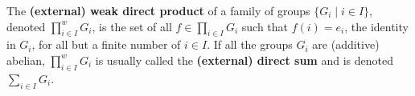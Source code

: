 \begin{definition}
The \textbf{(external) weak direct product} of a family of groups $\{G_i \mid i \in I\}$, denoted $\prod_{i \in I}^w G_i$, is the set of all $f \in \prod_{i \in I} G_i$ such that $f(i) = e_i$, the identity in $G_i$, for all but a finite number of $i \in I$. If all the groups $G_i$ are (additive) abelian, $\prod_{i \in I}^w G_i$ is usually called the \textbf{(external) direct sum} and is denoted $\sum_{i \in I} G_i$.
\end{definition}
